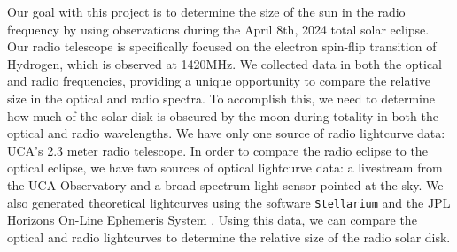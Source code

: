 Our goal with this project is to determine the size of the sun in the radio frequency by using observations during the April 8th, 2024 total solar eclipse.
Our radio telescope is specifically focused on the electron spin-flip transition of Hydrogen, which is observed at 1420MHz.
We collected data in both the optical and radio frequencies, providing a unique opportunity to compare the relative size in the optical and radio spectra.
To accomplish this, we need to determine how much of the solar disk is obscured by the moon during totality in both the optical and radio wavelengths.
We have only one source of radio lightcurve data: UCA's 2.3 meter radio telescope.
In order to compare the radio eclipse to the optical eclipse, we have two sources of optical lightcurve data: a livestream from the UCA Observatory and a broad-spectrum light sensor pointed at the sky.
We also generated theoretical lightcurves using the software \texttt{Stellarium}\cite{zotti_simulated_2020} and the JPL Horizons On-Line Ephemeris System \cite{nasa_jpl_solar_system_dynamics_group_jpl_nodate}.
Using this data, we can compare the optical and radio lightcurves to determine the relative size of the radio solar disk.
